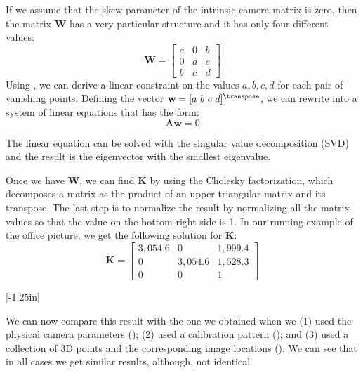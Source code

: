 If we assume that the skew parameter of the intrinsic camera matrix is zero, then the matrix $\mathbf{W}$ has a very particular structure and it has only four different values:
\begin{equation}
\mathbf{W} = 
    \begin{bmatrix}
    a & 0 & b\\
    0 & a & c\\
    b & c & d
    \end{bmatrix}
\end{equation}
Using \eqn{\ref{eq:vanishing_projection_constraint}}, we can derive a linear constraint on the values $a,b,c,d$ for each pair of vanishing points. Defining the vector $\mathbf{w}=[a~b~c~d]^\transpose$, we can rewrite \eqn{\ref{eq:vanishing_projection_constraint}} into a system of linear equations that has the form:
\begin{equation}
\mathbf{A} \mathbf{w} = 0
\end{equation}


The linear equation can be solved with the singular value decomposition (SVD) and the result is the eigenvector with the smallest eigenvalue. 

Once we have $\mathbf{W}$, we can find $\mathbf{K}$ by using the Cholesky factorization, which decomposes a matrix as the product of an upper triangular matrix and its transpose. The last step is to normalize the result by normalizing all the matrix values so that the value on the bottom-right side is 1.  In our running example of the office picture, we get the following solution for $\mathbf{K}$:
\begin{equation}
    \mathbf{K} = 
    \begin{bmatrix}
    3{,}054.6    &      0    &     1{,}999.4\\
       0    &       3{,}054.6    &     1{,}528.3\\
       0    &          0    &          1
    \end{bmatrix}
\end{equation}

[-1.25in]


We can now compare this result with the one we obtained when we (1) used the physical camera parameters (\sect{\ref{sec:simple_unreliable_calibration_method}}); (2) used a calibration pattern (\sect{\ref{sec:simple_unreliable_calibration_method}}); and (3) used a collection of 3D points and the corresponding image locations (\sect{\ref{sec:a_toy_example}}). We can see that in all cases we get similar results, although, not identical. 


